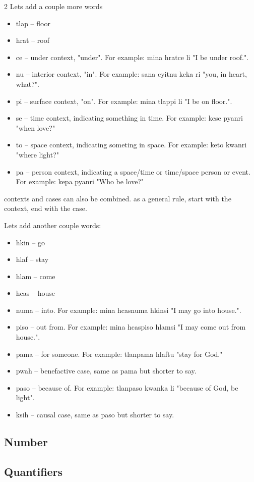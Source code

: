 \documentclass[10pt,pagesize]{article}
\providecommand{\tightlist}{%
  \setlength{\itemsep}{0pt}\setlength{\parskip}{0pt}}
\begin{document}
\begin{multicols}{2}
Lets add a couple more words
\begin{itemize}\tightlist
  \item tlap -- floor
  \item hrat -- roof
\end{itemize}

\begin{itemize}\tightlist
  \item ce -- under context, "under". For example: mina hratce li "I be under roof.".
  \item nu -- interior context, "in". For example: sana cyitnu keka ri "you, in heart, what?".
  \item pi -- surface context, "on". For example: mina tlappi li "I be on floor.".
  \item se -- time context, indicating something in time. For example: kese pyanri "when love?"
  \item to -- space context, indicating someting in space. For example: keto kwanri "where light?"
  \item pa -- person context, indicating a space/time or time/space person or event. For example: kepa pyanri "Who be love?"
\end{itemize}

contexts and cases can also be combined. as a general rule, start with the context, end with the case. 

Lets add another couple words:

\begin{itemize}\tightlist
  \item hkin -- go
  \item hlaf -- stay
  \item hlam -- come
  \item hcas -- house
\end{itemize}

\begin{itemize}\tightlist
  \item numa -- into. For example: mina hcasnuma hkinsi "I may go into house.".
  \item piso -- out from. For example: mina hcaspiso hlamsi "I may come out from house.".
  \item pama -- for someone. For example: tlanpama hlaftu "stay for God."
  \item pwah -- benefactive case, same as pama but shorter to say. 
  \item paso -- because of. For example: tlanpaso kwanka li "because of God, be light".
  \item ksih -- causal case, same as paso but shorter to say. 
\end{itemize}

\subsection{Number}
\subsection{Quantifiers}
\end{multicols}
\scriptsize
\end{document}

